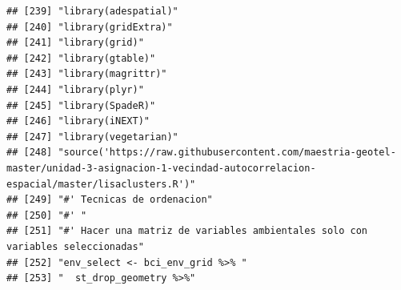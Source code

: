 \documentclass[11pt,]{article}
\begin{document}
\begin{verbatim}
## [239] "library(adespatial)"                                                                                                                                                   
## [240] "library(gridExtra)"                                                                                                                                                    
## [241] "library(grid)"                                                                                                                                                         
## [242] "library(gtable)"                                                                                                                                                       
## [243] "library(magrittr)"                                                                                                                                                     
## [244] "library(plyr)"                                                                                                                                                         
## [245] "library(SpadeR)"                                                                                                                                                       
## [246] "library(iNEXT)"                                                                                                                                                        
## [247] "library(vegetarian)"                                                                                                                                                   
## [248] "source('https://raw.githubusercontent.com/maestria-geotel-master/unidad-3-asignacion-1-vecindad-autocorrelacion-espacial/master/lisaclusters.R')"                      
## [249] "#' Tecnicas de ordenacion"                                                                                                                                             
## [250] "#' "                                                                                                                                                                   
## [251] "#' Hacer una matriz de variables ambientales solo con variables seleccionadas"                                                                                         
## [252] "env_select <- bci_env_grid %>% "                                                                                                                                       
## [253] "  st_drop_geometry %>%"                                                                                                                                                

\end{verbatim}
\end{document}
